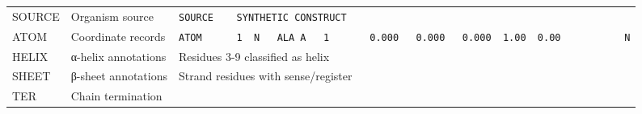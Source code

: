 \begin{longtable}[]{@{}lll@{}}
\begin{minipage}[t]{0.28\columnwidth}\raggedright
SOURCE\strut
\end{minipage} & \begin{minipage}[t]{0.32\columnwidth}\raggedright
Organism source\strut
\end{minipage} & \begin{minipage}[t]{0.32\columnwidth}\raggedright
\texttt{SOURCE\ \ \ \ SYNTHETIC\ CONSTRUCT}\strut
\end{minipage}\tabularnewline
\begin{minipage}[t]{0.28\columnwidth}\raggedright
ATOM\strut
\end{minipage} & \begin{minipage}[t]{0.32\columnwidth}\raggedright
Coordinate records\strut
\end{minipage} & \begin{minipage}[t]{0.32\columnwidth}\raggedright
\texttt{ATOM\ \ \ \ \ \ 1\ \ N\ \ \ ALA\ A\ \ \ 1\ \ \ \ \ \ \ 0.000\ \ \ 0.000\ \ \ 0.000\ \ 1.00\ \ 0.00\ \ \ \ \ \ \ \ \ \ \ N}\strut
\end{minipage}\tabularnewline
\begin{minipage}[t]{0.28\columnwidth}\raggedright
HELIX\strut
\end{minipage} & \begin{minipage}[t]{0.32\columnwidth}\raggedright
α-helix annotations\strut
\end{minipage} & \begin{minipage}[t]{0.32\columnwidth}\raggedright
Residues 3-9 classified as helix\strut
\end{minipage}\tabularnewline
\begin{minipage}[t]{0.28\columnwidth}\raggedright
SHEET\strut
\end{minipage} & \begin{minipage}[t]{0.32\columnwidth}\raggedright
β-sheet annotations\strut
\end{minipage} & \begin{minipage}[t]{0.32\columnwidth}\raggedright
Strand residues with sense/register\strut
\end{minipage}\tabularnewline
\begin{minipage}[t]{0.28\columnwidth}\raggedright
TER\strut
\end{minipage} & \begin{minipage}[t]{0.32\columnwidth}\raggedright
Chain termination\strut
\end{minipage} & \begin{minipage}[t]{0.32\columnwidth}\raggedright

\end{minipage}
\end{longtable}
